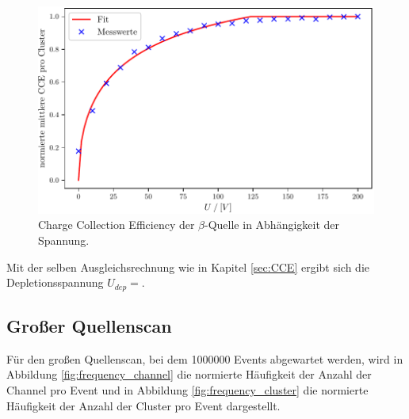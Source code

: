 \begin{figure}[H]
  \centering
  \includegraphics{build/CCEQ_fit.pdf}
  \caption{Charge Collection Efficiency der $\beta$-Quelle in Abhängigkeit der Spannung.}
  \label{fig:CEEQ_fit}
\end{figure}

Mit der selben Ausgleichsrechnung wie in Kapitel \ref{sec:CCE} ergibt sich die Depletionsspannung $U_{dep} = $.

\subsection{Großer Quellenscan}
Für den großen Quellenscan, bei dem 1000000 Events abgewartet werden, wird in Abbildung \ref{fig:frequency_channel} die normierte Häufigkeit der Anzahl der Channel pro Event und in Abbildung \ref{fig:frequency_cluster} die normierte Häufigkeit der Anzahl der Cluster pro Event dargestellt. 

